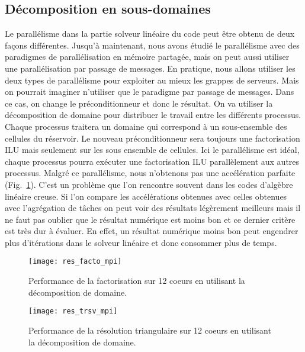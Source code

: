 \subsection{Décomposition en sous-domaines}
Le parallélisme dans la partie solveur linéaire du code peut être obtenu de deux façons différentes.
%
Jusqu'à maintenant, nous avons étudié le parallélisme avec des paradigmes de parallélisation en mémoire partagée, mais on peut aussi utiliser une parallélisation par passage de messages.
%
En pratique, nous allons utiliser les deux types de parallélisme pour exploiter au mieux les grappes de serveurs.
%
Mais on pourrait imaginer n'utiliser que le paradigme par passage de messages.
%
Dans ce cas, on change le préconditionneur et donc le résultat.
%
On va utiliser la décomposition de domaine pour distribuer le travail entre les différents processus.
%
Chaque processus traitera un domaine qui correspond à un sous-ensemble des cellules du réservoir.
%
Le nouveau préconditionneur sera toujours une factorisation ILU mais seulement sur les sous ensemble de cellules.
%
Ici le parallélisme est idéal, chaque processus pourra exécuter une factorisation ILU parallèlement aux autres processus.
%
Malgré ce parallélisme, nous n'obtenons pas une accélération parfaite (Fig.~\ref{fig:res_facto_mpi}).
%
C'est un problème que l'on rencontre souvent dans les codes d'algèbre linéaire creuse.
%
Si l'on compare les accélérations obtenues avec celles obtenues avec l'agrégation de tâches on peut voir des résultats légèrement meilleurs mais il ne faut pas oublier que le résultat numérique est moins bon et ce dernier critère est très dur à évaluer.
%
En effet, un résultat numérique moins bon peut engendrer plus d'itérations dans le solveur linéaire et donc consommer plus de temps.


\begin{figure}[t!]
  \centering
  \texttt{[image: res\_facto\_mpi]}
  \caption{Performance de la factorisation sur 12 coeurs en utilisant la décomposition de domaine.}
  \label{fig:res_facto_mpi}
\end{figure}

\begin{figure}[t!]
  \centering
  \texttt{[image: res\_trsv\_mpi]}
  \caption{Performance de la résolution triangulaire sur 12 coeurs en utilisant la décomposition de domaine.}
  \label{fig:res_trsv_mpi}
\end{figure}


